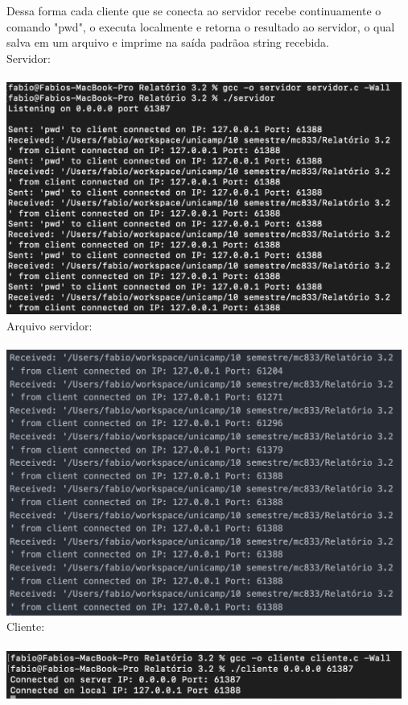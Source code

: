 \documentclass[12pt,a4paper]{report}
\begin{document}
\begin{enumerate}
    Dessa forma cada cliente que se conecta ao servidor recebe continuamente o comando "pwd", o executa localmente e retorna o resultado ao servidor, o qual salva em um arquivo e imprime na saída padrãoa string recebida.
    \\
    Servidor:\\\\
    \includegraphics[width=13cm]{images/ex2-servidor-execucao.png}\\
    Arquivo servidor:\\\\
    \includegraphics[width=13cm]{images/ex2-servidor-arquivo.png}\\
    Cliente:\\\\
    \includegraphics[width=13cm]{images/ex2-cliente-execucao.png}
    

\end{enumerate}
\end{document}
